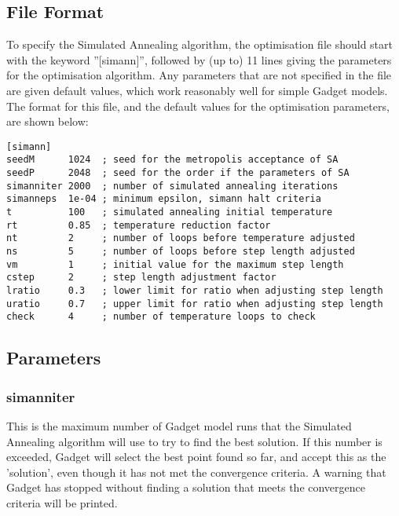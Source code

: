 \documentclass[10pt,twoside]{book}
\begin{document}
\subsection{File Format}\label{subsec:simannfile}
To specify the Simulated Annealing algorithm, the optimisation file should start with the keyword ''[simann]'', followed by (up to) 11 lines giving the parameters for the optimisation algorithm.  Any parameters that are not specified in the file are given default values, which work reasonably well for simple Gadget models.  The format for this file, and the default values for the optimisation parameters, are shown below:

{\small\begin{verbatim}
[simann]
seedM	   1024  ; seed for the metropolis acceptance of SA
seedP	   2048  ; seed for the order if the parameters of SA
simanniter 2000  ; number of simulated annealing iterations
simanneps  1e-04 ; minimum epsilon, simann halt criteria
t          100   ; simulated annealing initial temperature
rt         0.85  ; temperature reduction factor
nt         2     ; number of loops before temperature adjusted
ns         5     ; number of loops before step length adjusted
vm         1     ; initial value for the maximum step length
cstep      2     ; step length adjustment factor
lratio     0.3   ; lower limit for ratio when adjusting step length
uratio     0.7   ; upper limit for ratio when adjusting step length
check      4     ; number of temperature loops to check
\end{verbatim}}

\subsection{Parameters}\label{subsec:simannpar}
\subsubsection{simanniter}
This is the maximum number of Gadget model runs that the Simulated Annealing algorithm will use to try to find the best solution.  If this number is exceeded, Gadget will select the best point found so far, and accept this as the 'solution', even though it has not met the convergence criteria.  A warning that Gadget has stopped without finding a solution that meets the convergence criteria will be printed.
\end{document}

